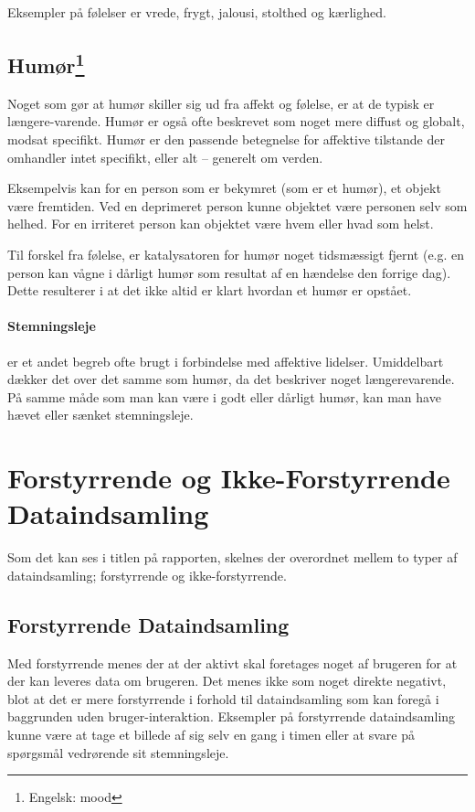 Eksempler på følelser er vrede, frygt, jalousi, stolthed og kærlighed.\cite[p. 322]{ekkekakis}

\subsection[Humør]{Humør\footnote{Engelsk: mood}}
Noget som gør at humør skiller sig ud fra affekt og følelse, er at de typisk er længere-varende.
Humør er også ofte beskrevet som noget mere diffust og globalt, modsat specifikt.
Humør er den passende betegnelse for affektive tilstande der omhandler intet specifikt, eller alt -- generelt om verden.

Eksempelvis kan for en person som er bekymret (som er et humør), et objekt være fremtiden.
Ved en deprimeret person kunne objektet være personen selv som helhed.
For en irriteret person kan objektet være hvem eller hvad som helst.

Til forskel fra følelse, er katalysatoren for humør noget tidsmæssigt fjernt (e.g. en person kan vågne i dårligt humør som resultat af en hændelse den forrige dag).
Dette resulterer i at det ikke altid er klart hvordan et humør er opstået.\cite[p. 322]{ekkekakis}

\paragraph{Stemningsleje} er et andet begreb ofte brugt i forbindelse med affektive lidelser.
Umiddelbart dækker det over det samme som humør, da det beskriver noget længerevarende.
På samme måde som man kan være i godt eller dårligt humør, kan man have hævet eller sænket stemningsleje.

\section{Forstyrrende og Ikke-Forstyrrende Dataindsamling}
Som det kan ses i titlen på rapporten, skelnes der overordnet mellem to typer af dataindsamling; forstyrrende og ikke-forstyrrende.

\subsection{Forstyrrende Dataindsamling}\label{begreber::forstyrrende}
Med forstyrrende menes der at der aktivt skal foretages noget af brugeren for at der kan leveres data om brugeren.
Det menes ikke som noget direkte negativt, blot at det er mere forstyrrende i forhold til dataindsamling som kan foregå i baggrunden uden bruger-interaktion.
Eksempler på forstyrrende dataindsamling kunne være at tage et billede af sig selv en gang i timen eller at svare på spørgsmål vedrørende sit stemningsleje.

